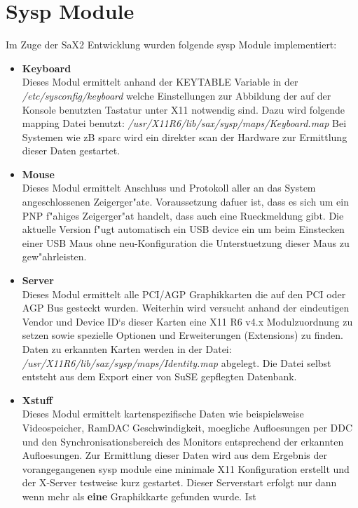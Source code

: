 \section{Sysp Module}
Im Zuge der SaX2 Entwicklung wurden folgende sysp Module implementiert:
\begin{itemize}
\item \textbf{Keyboard}\\
      Dieses Modul ermittelt anhand der KEYTABLE Variable in der
      \textit{/etc/sysconfig/keyboard} welche Einstellungen zur Abbildung der
      auf der Konsole benutzten Tastatur unter X11 notwendig sind. Dazu 
      wird folgende mapping Datei benutzt: 
      \textit{/usr/X11R6/lib/sax/sysp/maps/Keyboard.map}
      Bei Systemen wie zB sparc wird ein direkter scan der
      Hardware zur Ermittlung dieser Daten gestartet.
\item \textbf{Mouse}\\
      Dieses Modul ermittelt Anschluss und Protokoll aller an das System 
      angeschlossenen Zeigerger"ate. Voraussetzung dafuer ist, dass 
      es sich um ein PNP f"ahiges Zeigerger"at handelt, dass auch eine 
      Rueckmeldung gibt. Die aktuelle Version f"ugt automatisch ein
      USB device ein um beim Einstecken einer USB Maus ohne neu-Konfiguration
      die Unterstuetzung dieser Maus zu gew"ahrleisten.
\item \textbf{Server}\\
      Dieses Modul ermittelt alle PCI/AGP Graphikkarten die auf den 
      PCI oder AGP Bus gesteckt wurden. Weiterhin wird versucht anhand
      der eindeutigen Vendor und Device ID`s dieser Karten eine 
      X11 R6 v4.x Modulzuordnung zu setzen sowie spezielle Optionen 
      und Erweiterungen (Extensions) zu finden. Daten zu erkannten
      Karten werden in der Datei: 
      \textit{/usr/X11R6/lib/sax/sysp/maps/Identity.map} abgelegt.
      Die Datei selbst entsteht aus dem Export einer von SuSE gepflegten
      Datenbank.
\item \textbf{Xstuff}\\
      Dieses Modul ermittelt kartenspezifische Daten wie beispielsweise
      Videospeicher, RamDAC Geschwindigkeit, moegliche Aufloesungen per DDC
      und den Synchronisationsbereich des Monitors entsprechend der erkannten 
      Aufloesungen. Zur Ermittlung dieser Daten wird aus dem Ergebnis der 
      vorangegangenen sysp module eine minimale X11 Konfiguration erstellt
      und der X-Server testweise kurz gestartet. Dieser Serverstart erfolgt nur
      dann wenn mehr als \textbf{eine} Graphikkarte gefunden wurde. Ist

\end{itemize}
